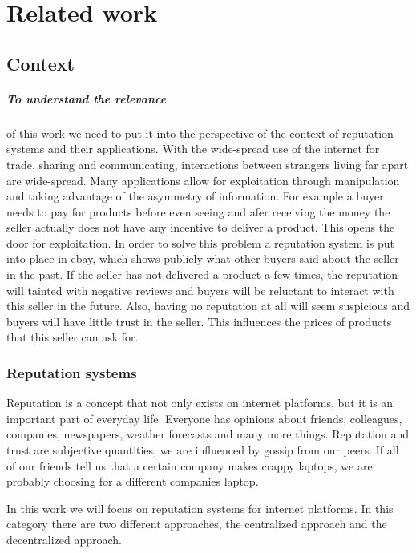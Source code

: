 \chapter{Related work}

\section{Context}

\paragraph{To understand the relevance} of this work we need to put it into the
perspective of the context of reputation systems and their applications. 
With the wide-spread use of the internet for trade, sharing and communicating,
interactions between strangers living far apart are wide-spread. Many applications
allow for exploitation through manipulation and taking advantage of the asymmetry
of information. For example a buyer needs to pay for products before even seeing
and afer receiving the money the seller actually does not have any incentive to
deliver a product. This opens the door for exploitation. In order to solve this
problem a reputation system is put into place in ebay, which shows publicly what
other buyers said about the seller in the past. If the seller has not delivered
a product a few times, the reputation will tainted with negative reviews and 
buyers will be reluctant to interact with this seller in the future. Also, having
no reputation at all will seem suspicious and buyers will have little trust in
the seller. This influences the prices of products that this seller can ask for.

\subsection{Reputation systems}

Reputation is a concept that not only exists on internet platforms, but it is 
an important part of everyday life. Everyone has opinions about friends, colleagues,
companies, newspapers, weather forecasts and many more things. Reputation and 
trust are subjective quantities, we are influenced by gossip from our peers. If
all of our friends tell us that a certain company makes crappy laptops, we are
probably choosing for a different companies laptop.

In this work we will focus on reputation systems for internet platforms. In this
category there are two different approaches, the centralized approach and the 
decentralized approach.

